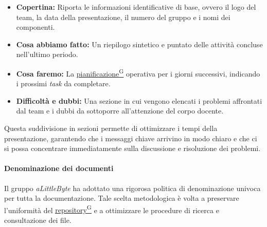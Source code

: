 \documentclass[a4paper,12pt]{article}
\providecommand{\glslink}[2]{\href{https://alittlebyte-19.github.io/Documentazione/glossario.html\#gls-#1}{\underline{#2}\textsuperscript{\scriptsize G}}}
\begin{document}
\begin{itemize}
    \item \textbf{Copertina:} Riporta le informazioni identificative di base, ovvero il logo del team, la data della presentazione, il numero del gruppo e i nomi dei componenti.
    
    \item \textbf{Cosa abbiamo fatto:} Un riepilogo sintetico e puntato delle attività concluse nell'ultimo periodo.
    
    \item \textbf{Cosa faremo:} La \glslink{pianificazione}{pianificazione} operativa per i giorni successivi, indicando i prossimi \textit{task} da completare.
    
    \item \textbf{Difficoltà e dubbi:} Una sezione in cui vengono elencati i problemi affrontati dal team e i dubbi da sottoporre all'attenzione del corpo docente.
\end{itemize}

Questa suddivisione in sezioni permette di ottimizzare i tempi della presentazione, garantendo che i messaggi chiave arrivino in modo chiaro e che ci si possa concentrare immediatamente sulla discussione e risoluzione dei problemi.

\paragraph{Denominazione dei documenti}

Il gruppo \textit{aLittleByte} ha adottato una rigorosa politica di denominazione univoca per tutta la documentazione. Tale scelta metodologica è volta a preservare l'uniformità del \glslink{repository}{repository} e a ottimizzare le procedure di ricerca e consultazione dei file.
\end{document}
